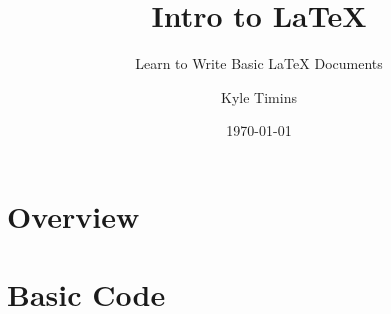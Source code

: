 \documentclass[compress,14pt]{beamer}
\title{Intro to \LaTeX{}}
\subtitle{Learn to Write Basic \LaTeX{} Documents}
\author{Kyle Timins}
\institute[Vermont Technical College]{Vermont Technical College}
\date{\today{}}
\begin{document}
\frame{
    \titlepage
}

\section[Outline]{}
\frame{\tableofcontents}

\section{Overview}


\section{Basic Code}

\end{document}
